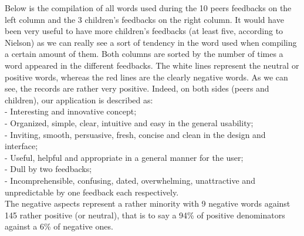 \documentclass[12pt]{scrartcl}
\begin{document}
	Below is the compilation of all words used during the 10 peers feedbacks on the left column and the 3 children’s feedbacks on the right column. It would have been very useful to have more children’s feedbacks (at least five, according to Nielson) as we can really see a sort of tendency in the word used when compiling a certain amount of them. Both columns are sorted by the number of times a word appeared in the different feedbacks. The white lines represent the neutral or positive words, whereas the red lines are the clearly negative words. As we can see, the records are rather very positive. Indeed, on both sides (peers and children), our application is described as:\\
	
		- Interesting and innovative concept;\\
		
		- Organized, simple, clear, intuitive and easy in the general usability;\\
		
		- Inviting, smooth, persuasive, fresh, concise and clean in the design and interface;\\
		
		- Useful, helpful and appropriate in a general manner for the user;\\
	
		- Dull by two feedbacks;\\
		
		- Incomprehensible, confusing, dated, overwhelming, unattractive and unpredictable by one feedback each respectively.\\

	The negative aspects represent a rather minority with 9 negative words against 145 rather positive (or neutral), that is to say a 94\% of positive denominators against a 6\% of negative ones.
	
	\newpage
\end{document}

